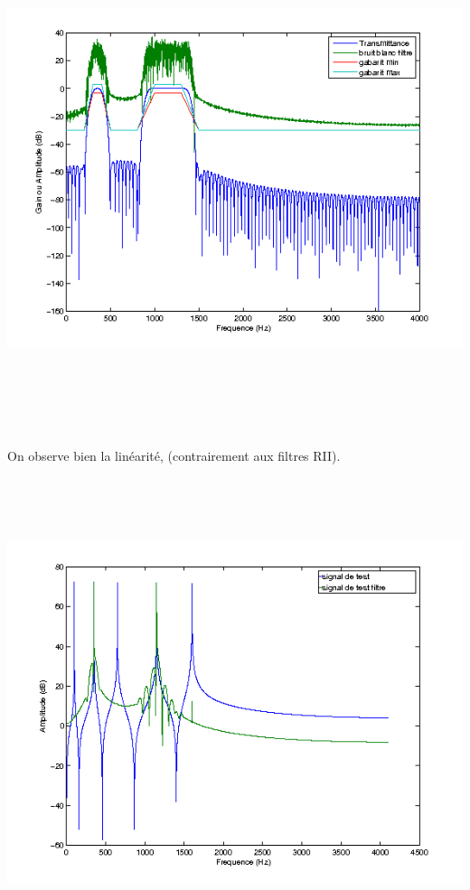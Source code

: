 \documentclass{article}
\begin{document}
\inputminted[linenos,lastline=21]{matlab}{RIF.m}
\includegraphics[height=13cm]{RIF_1}
\inputminted[linenos,firstnumber=25,firstline=25,lastline=25]{matlab}{RIF.m}
\includegraphics[height=0cm]{RIF_2} \\
On observe bien la linéarité, (contrairement aux filtres RII). \\
\inputminted[linenos,firstnumber=30,firstline=30,lastline=36]{matlab}{RIF.m}
\includegraphics[height=13cm]{RIF_3}
\end{document}
